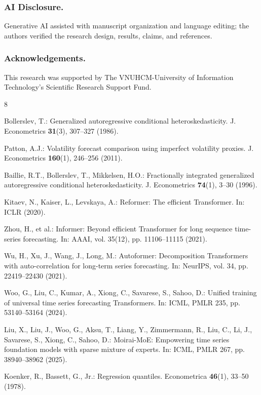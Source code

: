 \documentclass[runningheads]{llncs}
\begin{document}
\subsubsection{AI Disclosure.} Generative AI assisted with manuscript organization and language editing; the authors verified the research design, results, claims, and references.

\subsubsection{Acknowledgements.}This research was supported by The VNUHCM-University of Information Technology's Scientific Research Support Fund.

\begin{thebibliography}{8}

Bollerslev, T.: Generalized autoregressive conditional heteroskedasticity. J. Econometrics \textbf{31}(3), 307--327 (1986).

Patton, A.J.: Volatility forecast comparison using imperfect volatility proxies. J. Econometrics \textbf{160}(1), 246--256 (2011).

Baillie, R.T., Bollerslev, T., Mikkelsen, H.O.: Fractionally integrated generalized autoregressive conditional heteroskedasticity. J. Econometrics \textbf{74}(1), 3--30 (1996).

Kitaev, N., Kaiser, L., Levskaya, A.: Reformer: The efficient Transformer. In: ICLR (2020).

Zhou, H., et al.: Informer: Beyond efficient Transformer for long sequence time-series forecasting. In: AAAI, vol. 35(12), pp. 11106--11115 (2021).

Wu, H., Xu, J., Wang, J., Long, M.: Autoformer: Decomposition Transformers with auto-correlation for long-term series forecasting. In: NeurIPS, vol. 34, pp. 22419--22430 (2021).

Woo, G., Liu, C., Kumar, A., Xiong, C., Savarese, S., Sahoo, D.: Unified training of universal time series forecasting Transformers. In: ICML, PMLR 235, pp. 53140--53164 (2024).

Liu, X., Liu, J., Woo, G., Aksu, T., Liang, Y., Zimmermann, R., Liu, C., Li, J., Savarese, S., Xiong, C., Sahoo, D.: Moirai-MoE: Empowering time series foundation models with sparse mixture of experts. In: ICML, PMLR 267, pp. 38940--38962 (2025).

Koenker, R., Bassett, G., Jr.: Regression quantiles. Econometrica \textbf{46}(1), 33--50 (1978).


\end{thebibliography}
\end{document}
